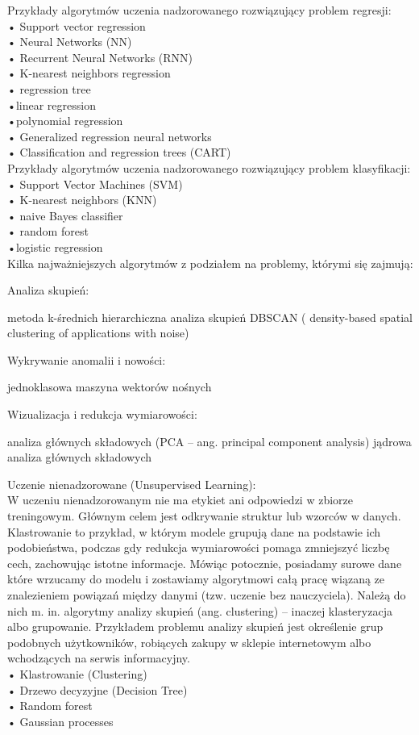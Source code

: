 Przykłady algorytmów uczenia nadzorowanego rozwiązujący problem regresji:\\
    • Support vector regression\\ 
    • Neural Networks (NN)\\
    • Recurrent Neural Networks (RNN)\\
    • K-nearest neighbors regression\\
    • regression tree\\
    •linear regression \\
    •polynomial regression\\
    • Generalized regression neural networks\\
    • Classification and regression trees (CART)\\

    Przykłady algorytmów uczenia nadzorowanego rozwiązujący problem klasyfikacji:\\
    • Support Vector Machines (SVM)\\
    • K-nearest neighbors (KNN)\\
    • naive Bayes classifier\\
    • random forest\\
    •logistic regression \\

Kilka najważniejszych algorytmów z podziałem na problemy, którymi się zajmują:

Analiza skupień:

    metoda k-średnich
    hierarchiczna analiza skupień
    DBSCAN ( density-based spatial clustering of applications with noise)

Wykrywanie anomalii i nowości:

    jednoklasowa maszyna wektorów nośnych

Wizualizacja i redukcja wymiarowości:

    analiza głównych składowych (PCA – ang. principal component analysis)
    jądrowa analiza głównych składowych


    
Uczenie nienadzorowane (Unsupervised Learning):\\
W uczeniu nienadzorowanym nie ma etykiet ani odpowiedzi w zbiorze treningowym. Głównym celem jest odkrywanie struktur lub wzorców w danych. Klastrowanie to przykład, w którym modele grupują dane na podstawie ich podobieństwa, podczas gdy redukcja wymiarowości pomaga zmniejszyć liczbę cech, zachowując istotne informacje. Mówiąc potocznie, posiadamy surowe dane które wrzucamy do modelu i zostawiamy algorytmowi całą pracę wiązaną ze znalezieniem powiązań między danymi (tzw. uczenie bez nauczyciela). Należą do nich m. in. algorytmy analizy skupień (ang. clustering) – inaczej klasteryzacja albo grupowanie. Przykładem problemu analizy skupień jest określenie grup podobnych użytkowników, robiących zakupy w sklepie internetowym albo wchodzących na serwis informacyjny. \\
    • Klastrowanie (Clustering)\\
    • Drzewo decyzyjne (Decision Tree)\\
    • Random forest\\
    • Gaussian processes\\

